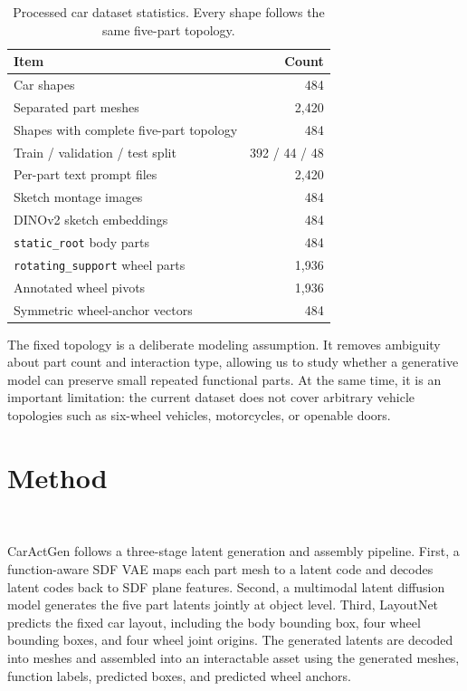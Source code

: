 \documentclass[10pt]{article}
\newcommand{\method}{CarActGen\xspace}
\begin{document}
\begin{table}[t]
\centering
\caption{Processed car dataset statistics. Every shape follows the same five-part topology.}
\label{tab:dataset}
\begin{tabular}{lr}
\toprule
Item & Count \\
\midrule
Car shapes & 484 \\
Separated part meshes & 2,420 \\
Shapes with complete five-part topology & 484 \\
Train / validation / test split & 392 / 44 / 48 \\
Per-part text prompt files & 2,420 \\
Sketch montage images & 484 \\
DINOv2 sketch embeddings & 484 \\
\texttt{static\_root} body parts & 484 \\
\texttt{rotating\_support} wheel parts & 1,936 \\
Annotated wheel pivots & 1,936 \\
Symmetric wheel-anchor vectors & 484 \\
\bottomrule
\end{tabular}
\end{table}

The fixed topology is a deliberate modeling assumption. It removes ambiguity about part count and interaction type, allowing us to study whether a generative model can preserve small repeated functional parts. At the same time, it is an important limitation: the current dataset does not cover arbitrary vehicle topologies such as six-wheel vehicles, motorcycles, or openable doors.

\section{Method}

\ 

\method follows a three-stage latent generation and assembly pipeline. First, a function-aware SDF VAE maps each part mesh to a latent code and decodes latent codes back to SDF plane features. Second, a multimodal latent diffusion model generates the five part latents jointly at object level. Third, LayoutNet predicts the fixed car layout, including the body bounding box, four wheel bounding boxes, and four wheel joint origins. The generated latents are decoded into meshes and assembled into an interactable asset using the generated meshes, function labels, predicted boxes, and predicted wheel anchors.
\end{document}
